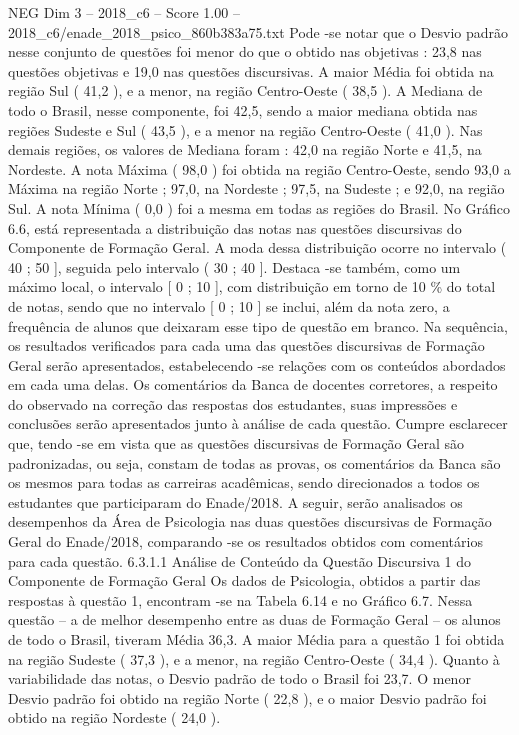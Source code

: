 \begin{textsample}{NEG Dim 3 – 2018\_c6 – Score 1.00 – 2018\_c6/enade\_2018\_psico\_860b383a75.txt}
Pode -se notar que o Desvio padrão nesse conjunto de questões foi menor do que o obtido nas objetivas : 23,8 nas questões objetivas e 19,0 nas questões discursivas.
A maior Média foi obtida na região Sul ( 41,2 ), e a menor, na região Centro-Oeste ( 38,5 ).
A Mediana de todo o Brasil, nesse componente, foi 42,5, sendo a maior mediana obtida nas regiões Sudeste e Sul ( 43,5 ), e a menor na região Centro-Oeste ( 41,0 ).
Nas demais regiões, os valores de Mediana foram : 42,0 na região Norte e 41,5, na Nordeste.
A nota Máxima ( 98,0 ) foi obtida na região Centro-Oeste, sendo 93,0 a Máxima na região Norte ; 97,0, na Nordeste ; 97,5, na Sudeste ; e 92,0, na região Sul.
A nota Mínima ( 0,0 ) foi a mesma em todas as regiões do Brasil.
No Gráfico 6.6, está representada a distribuição das notas nas questões discursivas do Componente de Formação Geral.
A moda dessa distribuição ocorre no intervalo ( 40 ; 50 ], seguida pelo intervalo ( 30 ; 40 ].
Destaca -se também, como um máximo local, o intervalo [ 0 ; 10 ], com distribuição em torno de 10 \% do total de notas, sendo que no intervalo [ 0 ; 10 ] se inclui, além da nota zero, a frequência de alunos que deixaram esse tipo de questão em branco.
Na sequência, os resultados verificados para cada uma das questões discursivas de Formação Geral serão apresentados, estabelecendo -se relações com os conteúdos abordados em cada uma delas.
Os comentários da Banca de docentes corretores, a respeito do observado na correção das respostas dos estudantes, suas impressões e conclusões serão apresentados junto à análise de cada questão.
Cumpre esclarecer que, tendo -se em vista que as questões discursivas de Formação Geral são padronizadas, ou seja, constam de todas as provas, os comentários da Banca são os mesmos para todas as carreiras acadêmicas, sendo direcionados a todos os estudantes que participaram do Enade/2018.
A seguir, serão analisados os desempenhos da Área de Psicologia nas duas questões discursivas de Formação Geral do Enade/2018, comparando -se os resultados obtidos com comentários para cada questão. 6.3.1.1 Análise de Conteúdo da Questão Discursiva 1 do Componente de Formação Geral Os dados de Psicologia, obtidos a partir das respostas à questão 1, encontram -se na Tabela 6.14 e no Gráfico 6.7.
Nessa questão – a de melhor desempenho entre as duas de Formação Geral – os alunos de todo o Brasil, tiveram Média 36,3.
A maior Média para a questão 1 foi obtida na região Sudeste ( 37,3 ), e a menor, na região Centro-Oeste ( 34,4 ).
Quanto à variabilidade das notas, o Desvio padrão de todo o Brasil foi 23,7.
O menor Desvio padrão foi obtido na região Norte ( 22,8 ), e o maior Desvio padrão foi obtido na região Nordeste ( 24,0 ).

\end{textsample}
